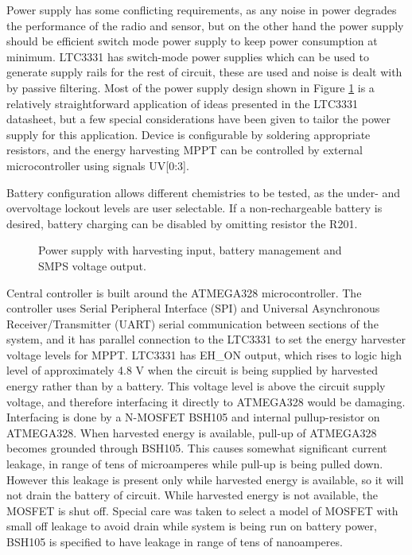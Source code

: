 Power supply has some conflicting requirements, as any noise in power degrades the performance of the radio and sensor, but on the other hand the power supply should be efficient switch mode power supply to keep power consumption at minimum. LTC3331 has switch-mode power supplies which can be used to generate supply rails for the rest of circuit, these are used and noise is dealt with by passive filtering. Most of the power supply design shown in Figure \ref{fig:psu_circuit} is a relatively straightforward application of ideas presented in the LTC3331 datasheet, but a few special considerations have been given to tailor the power supply for this application. Device is configurable by soldering appropriate resistors, and the energy harvesting MPPT can be controlled by external microcontroller using signals UV[0:3]. 

Battery configuration allows different chemistries to be tested, as the under- and overvoltage lockout levels are user selectable. If a non-rechargeable battery is desired, battery charging can be disabled by omitting resistor the R201. 

\begin{figure}
    \centering
    \def\svgwidth{\columnwidth}
    
    \caption{\label{fig:psu_circuit} Power supply with harvesting input, battery management and SMPS voltage output.}
\end{figure}

Central controller is built around the ATMEGA328 \cite{atmega328} microcontroller. The controller uses Serial Peripheral Interface (SPI) and Universal Asynchronous Receiver/Transmitter (UART) serial communication between sections of the system, and it has parallel connection to the LTC3331 to set the energy harvester voltage levels for MPPT. LTC3331 has EH\_ON output, which rises to logic high level of approximately 4.8 V when the circuit is being supplied by harvested energy rather than by a battery. This voltage level is above the circuit supply voltage, and therefore interfacing it directly to ATMEGA328 would be damaging. Interfacing is done by a N-MOSFET BSH105 \cite{BSH105} and internal pullup-resistor on ATMEGA328. When harvested energy is available, pull-up of ATMEGA328 becomes grounded through BSH105. This causes somewhat significant current leakage, in range of tens of microamperes while pull-up is being pulled down. However this leakage is present only while harvested energy is available, so it will not drain the battery of circuit. While harvested energy is not available, the MOSFET is shut off. Special care was taken to select a model of MOSFET with small off leakage to avoid drain while system is being run on battery power, BSH105 is specified to have leakage in range of tens of nanoamperes. 

